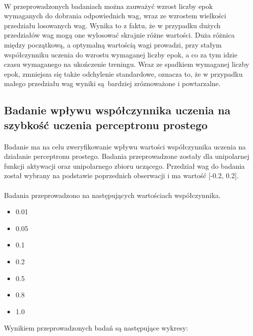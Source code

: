 \documentclass[\main/main.tex]{subfiles}
\begin{document}
    \paragraph{}
    W przeprowadzonych badaniach można zauważyć wzrost liczby epok wymaganych do dobrania odpowiednich wag, wraz ze wzrostem wielkości przedziału losowanych wag. Wynika to z faktu, że w przypadku dużych przedziałów wag mogą one wylosować skrajnie różne wartości. Duża różnica między początkową, a optymalną wartością wagi prowadzi, przy stałym współczynniku uczenia do wzrostu wymaganej liczby epok, a co za tym idzie czasu wymaganego na ukończenie treningu. Wraz ze spadkiem wymaganej liczby epok, zmniejsza się także odchylenie standardowe, oznacza to, że w przypadku małego przedziału wag wyniki są bardziej zróznoważone i powtarzalne.

    \justify
    \subsection{Badanie wpływu współczynnika uczenia  na szybkość uczenia perceptronu prostego}
    \paragraph{}
    Badanie ma na celu zweryfikowanie wpływu wartości współczynnika uczenia na działanie perceptronu prostego. Badania przeprowadzone zostały dla unipolarnej funkcji aktywacji oraz unipolarnego zbioru uczącego. Przedział wag do badania został wybrany na podstawie poprzednich obserwacji i ma wartość [-0.2, 0.2].
    
    \paragraph{}
    Badania przeprowadzono na następujących wartościach współczynnika.
    \begin{itemize}
    \item 0.01
    \item 0.05
    \item 0.1
    \item 0.2
    \item 0.5
    \item 0.8
    \item 1.0
    \end{itemize}
    
    Wynikiem przeprowadzonych badań są następujące wykresy:
    
\end{document}
